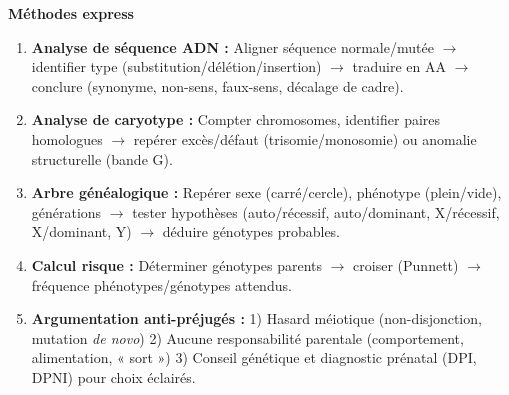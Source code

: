 \documentclass[11pt]{article}
\begin{document}
\begin{aretenir}
\textbf{Méthodes express}\par
\begin{enumerate}
\item \textbf{Analyse de séquence ADN :} Aligner séquence normale/mutée $\rightarrow$ identifier type (substitution/délétion/insertion) $\rightarrow$ traduire en AA $\rightarrow$ conclure (synonyme, non-sens, faux-sens, décalage de cadre).
\item \textbf{Analyse de caryotype :} Compter chromosomes, identifier paires homologues $\rightarrow$ repérer excès/défaut (trisomie/monosomie) ou anomalie structurelle (bande G).
\item \textbf{Arbre généalogique :} Repérer sexe (carré/cercle), phénotype (plein/vide), générations $\rightarrow$ tester hypothèses (auto/récessif, auto/dominant, X/récessif, X/dominant, Y) $\rightarrow$ déduire génotypes probables.
\item \textbf{Calcul risque :} Déterminer génotypes parents $\rightarrow$ croiser (Punnett) $\rightarrow$ fréquence phénotypes/génotypes attendus.
\item \textbf{Argumentation anti-préjugés :} 1) Hasard méiotique (non-disjonction, mutation \emph{de novo}) 2) Aucune responsabilité parentale (comportement, alimentation, « sort ») 3) Conseil génétique et diagnostic prénatal (DPI, DPNI) pour choix éclairés.
\end{enumerate}
\end{aretenir}
\end{document}
